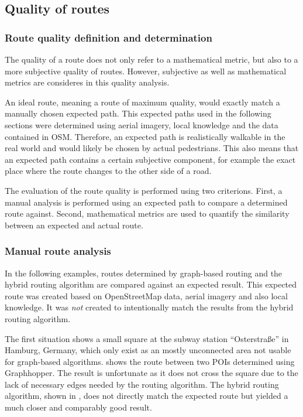 	\subsection{Quality of routes}
	
		\subsubsection{Route quality definition and determination}
	
			The quality of a route does not only refer to a mathematical metric, but also to a more subjective quality of routes.
			However, subjective as well as mathematical metrics are consideres in this quality analysis.
			
			An ideal route, meaning a route of maximum quality, would exactly match a manually chosen expected path.
			This expected paths used in the following sections were determined using aerial imagery, local knowledge and the data contained in OSM.
			Therefore, an expected path is realistically walkable in the real world and would likely be chosen by actual pedestrians.
			This also means that an expected path contains a certain subjective component, for example the exact place where the route changes to the other side of a road.
	
			The evaluation of the route quality is performed using two criterions.
			First, a manual analysis is performed using an expected path to compare a determined route against.
			Second, mathematical metrics are used to quantify the similarity between an expected and actual route.
		
		\subsubsection{Manual route analysis}
		
			In the following examples, routes determined by graph-based routing and the hybrid routing algorithm are compared against an expected result.
			This expected route was created based on OpenStreetMap data, aerial imagery and also local knowledge.
			It was \emph{not} created to intentionally match the results from the hybrid routing algorithm.
		
			The first situation shows a small square at the subway station \enquote{Osterstraße} in Hamburg, Germany, which only exist as an mostly unconnected area not usable for graph-based algorithms.
			 shows the route between two POIs determined using Graphhopper.
			The result is unfortunate as it does not cross the square due to the lack of necessary edges needed by the routing algorithm.
			The hybrid routing algorithm, shown in , does not directly match the expected route but yielded a much closer and comparably good result.
			
